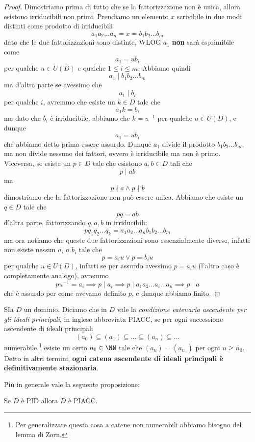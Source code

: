 \documentclass[11pt]{scrartcl}
\begin{document}
	\begin{proof}
		Dimostriamo prima di tutto che se la fattorizzazione non è unica, allora esistono irriducibili non primi. Prendiamo un elemento $x$ scrivibile in due modi distinti come prodotto di irriducibili
		$$a_1a_2\dots a_n=x=b_1b_2\dots b_m$$
		dato che le due fattorizzazioni sono distinte, WLOG $a_1$ \textbf{non} sarà esprimibile come 
		$$a_1=ub_i$$
		per qualche $u\in U(D)$ e qualche $1\le i\le m$. Abbiamo quindi 
		$$a_1\mid b_1b_2\dots b_m$$
		ma d'altra parte se avessimo che
		$$a_1\mid b_i$$
		per qualche $i$, avremmo che esiste un $k\in D$ tale che 
		$$a_1k=b_i$$
		ma dato che $b_i$ è irriducibile, abbiamo che $k=u^{-1}$ per qualche $u\in U(D)$, e dunque 
		$$a_1=ub_i$$
		che abbiamo detto prima essere assurdo. Dunque $a_1$ divide il prodotto $b_1b_2\dots b_m$, ma non divide nessuno dei fattori, ovvero è irriducibile ma non è primo. Viceversa, se esiste un $p\in D$ tale che esistono $a,b\in D$ tali che
		$$p\mid ab$$
		ma 
		$$p\nmid a \land p\nmid b$$
		dimostriamo che la fattorizzazione non può essere unica. Abbiamo che esiste un $q\in D$ tale che
		$$pq=ab$$
		d'altra parte, fattorizzando $q,a,b$ in irriducibili:
		$$pq_1q_2\dots q_k=a_1a_2\dots a_n b_1b_2 \dots b_m$$
		ma ora notiamo che queste due fattorizzazioni sono essenzialmente diverse, infatti non esiste nessun $a_i$ o $b_i$ tale che 
		$$p=a_iu \lor p=b_iu$$
		per qualche $u\in U(D)$, infatti se per assurdo avessimo $p=a_iu$ (l'altro caso è completamente analogo), avremmo
		$$pu^{-1}=a_i \implies p\mid a_i \implies p\mid a_1a_2\dots a_i \dots a_n \implies p\mid a$$
		che è assurdo per come avevamo definito $p$, e dunque abbiamo finito.
	\end{proof}
	\begin{definition}[PIACC]
		SIa $D$ un dominio. Diciamo che in $D$ vale la \textit{condizione catenaria ascendente per gli ideali principali}, in inglese abbreviata PIACC, se per ogni successione ascendente di ideali principali
		$$(a_0)\subseteq (a_1)\subseteq \dots \subseteq(a_n)\subseteq \dots$$
		numerabile,\footnote{Per generalizzare questa cosa a catene non numerabili abbiamo bisogno del lemma di Zorn.} esiste un certo $n_0\in \NN$ tale che $(a_n)=(a_{n_0})$ per ogni $n\ge n_0$. Detto in altri termini, \textbf{ogni catena ascendente di ideali principali è definitivamente stazionaria}.
	\end{definition}
	Più in generale vale la seguente proposizione:
	\begin{proposition}\label{I domini a ideali principali sodisfano la condizione sulle catene ascendenti}
		Se $D$ è PID allora $D$ è PIACC.
	\end{proposition}
\end{document}
